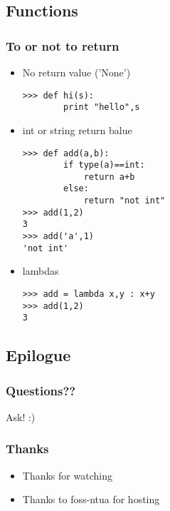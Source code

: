 \documentclass{beamer}
\begin{document}
\subsection{Functions}
\begin{frame}[fragile]
    \frametitle{To or not to return}
    \begin{itemize}
        \item<1-> No return value ('None')
            \begin{verbatim}
>>> def hi(s):
        print "hello",s
            \end{verbatim}
        \item<2-> int or string return balue
            \begin{verbatim}
>>> def add(a,b):
        if type(a)==int:
            return a+b
        else:
            return "not int"
>>> add(1,2)
3
>>> add('a',1)
'not int'
            \end{verbatim}
        \item<3-> lambdas
            \begin{verbatim}
>>> add = lambda x,y : x+y
>>> add(1,2)
3
            \end{verbatim}
    \end{itemize}
\end{frame}

\subsection{Epilogue}
\begin{frame}
    \frametitle{Questions??}
    Ask! :)
\end{frame}

\begin{frame}[fragile]
    \frametitle{Thanks}
    \begin{itemize}
        \item Thanks for watching
        \item Thanks to foss-ntua for hosting
    \end{itemize}
\end{frame}
\end{document}
